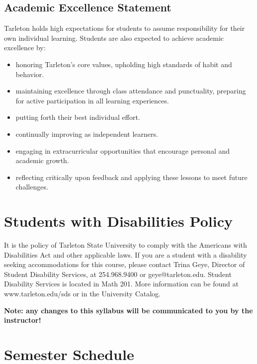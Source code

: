 \documentclass[10pt]{article}
\begin{document}
\subsection*{Academic Excellence Statement}
\label{sec:org0c80530}
Tarleton holds high expectations for students to assume responsibility for their own individual learning. Students are also expected to achieve academic excellence by:
\begin{itemize}
\item honoring Tarleton’s core values, upholding high standards of habit and behavior.
\item maintaining excellence through class attendance and punctuality, preparing for active participation in all learning experiences.
\item putting forth their best individual effort.
\item continually improving as independent learners.
\item engaging in extracurricular opportunities that encourage personal and academic growth.
\item reflecting critically upon feedback and applying these lessons to meet future challenges.
\end{itemize}

\section*{Students with Disabilities Policy}
\label{sec:org0f517d7}

It is the policy of Tarleton State University to comply with the Americans
with Disabilities Act and other applicable laws. If you are a student with a
disability seeking accommodations for this course, please contact Trina
Geye, Director of Student Disability Services, at 254.968.9400 or
geye@tarleton.edu. Student Disability Services is
located in Math 201. More information can be found at www.tarleton.edu/sds or in the University Catalog.


\textbf{\textbf{Note:  any changes to this syllabus will be communicated to you by the instructor!}}

\section*{Semester Schedule}
\label{sec:org8dc205d}
\end{document}
